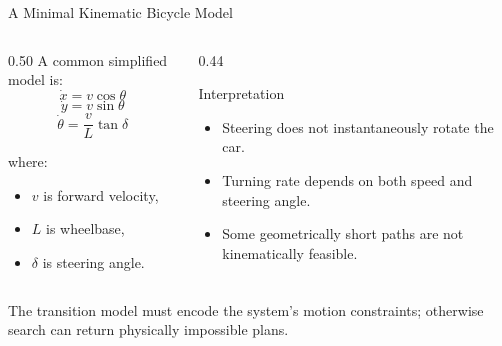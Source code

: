 \documentclass[aspectratio=169,10pt]{beamer}
\begin{document}
\begin{frame}[shrink=20]{A Minimal Kinematic Bicycle Model}
  \begin{columns}[T,onlytextwidth]
    \begin{column}{0.50\textwidth}
      A common simplified model is:
      \[
        \dot{x}=v\cos\theta
      \]
      \[
        \dot{y}=v\sin\theta
      \]
      \[
        \dot{\theta}=\frac{v}{L}\tan\delta
      \]

      where:
      \begin{itemize}
        \item $v$ is forward velocity,
        \item $L$ is wheelbase,
        \item $\delta$ is steering angle.
      \end{itemize}
    \end{column}

    \begin{column}{0.44\textwidth}
      \begin{block}{Interpretation}
        \begin{itemize}
          \item Steering does not instantaneously rotate the car.
          \item Turning rate depends on both speed and steering angle.
          \item Some geometrically short paths are not kinematically feasible.
        \end{itemize}
      \end{block}
    \end{column}
  \end{columns}

  \begin{keyidea}
    The transition model must encode the system's motion constraints; otherwise search can return physically impossible plans.
  \end{keyidea}
\end{frame}
\end{document}
